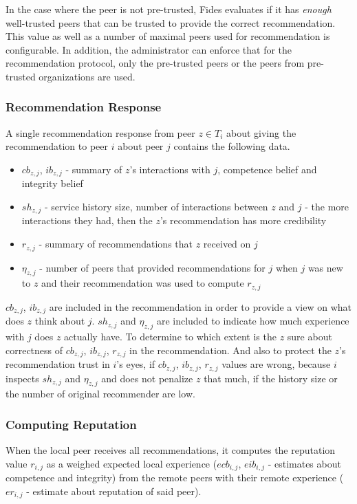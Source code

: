 In the case where the peer is not pre-trusted, Fides evaluates if it has \textit{enough} well-trusted peers that can be trusted to provide the correct recommendation. This value as well as a number of maximal peers used for recommendation is configurable.
In addition, the administrator can enforce that for the recommendation protocol, only the pre-trusted peers or the peers from pre-trusted organizations are used.

\subsubsection{Recommendation Response}
A single recommendation response from peer $z \in T_{i}$ about giving the recommendation to peer $i$ about peer $j$ contains the following data.
\begin{itemize}
    \item $cb_{z,j}$, $ib_{z,j}$ - summary of $z$'s interactions with $j$, competence belief and integrity belief
    \item $sh_{z,j}$ - service history size, number of interactions between $z$ and $j$ - the more interactions they had, then the $z$'s recommendation has more credibility
    \item $r_{z, j}$ - summary of recommendations that $z$ received on $j$
    \item $\eta_{z,j}$ - number of peers that provided recommendations for $j$ when $j$ was new to $z$ and their recommendation was used to compute $r_{z,j}$
\end{itemize}

$cb_{z,j}$, $ib_{z,j}$ are included in the recommendation in order to provide a view on what does $z$ think about $j$.
$sh_{z,j}$ and $\eta_{z,j}$ are included to indicate how much experience with $j$ does $z$ actually have. To determine to which extent is the $z$ sure about correctness of $cb_{z,j}$, $ib_{z,j}$, $r_{z, j}$ in the recommendation.
And also to protect the $z$'s recommendation trust in $i$'s eyes, if $cb_{z,j}$, $ib_{z,j}$, $r_{z, j}$ values are wrong, because $i$ inspects $sh_{z,j}$ and $\eta_{z,j}$ and does not penalize $z$ that much, if the history size or the number of original recommender are low.

\subsubsection{Computing Reputation}
\label{subsubsec:computing-reputation}
When the local peer receives all recommendations, it computes the reputation value $r_{i,j}$ as a weighed expected local experience ($ecb_{i,j}$, $eib_{i,j}$ - estimates about competence and integrity) from the remote peers with their remote experience ($er_{i,j}$ - estimate about reputation of said peer).

